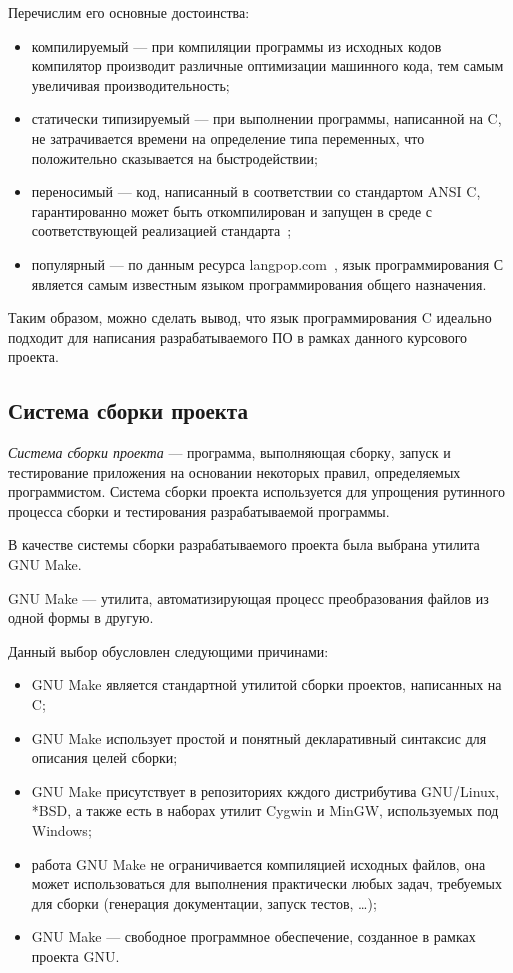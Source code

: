 Перечислим его основные достоинства:
\begin{itemize}
\item компилируемый --- при компиляции программы из исходных кодов
  компилятор производит различные оптимизации машинного кода, 
  тем самым увеличивая производительность;
\item статически типизируемый --- при выполнении программы, написанной на C,
  не затрачивается времени на определение типа переменных,
  что положительно сказывается на быстродействии;
\item переносимый --- код, написанный в соответствии со стандартом ANSI C,
  гарантированно может быть откомпилирован и запущен в среде с 
  соответствующей реализацией стандарта~\cite{ansi_c};
\item популярный --- по данным ресурса langpop.com~\cite{langs_popularity},
  язык программирования С является самым известным языком программирования 
  общего назначения.
\end{itemize}

Таким образом, можно сделать вывод, что язык программирования C идеально 
подходит для написания разрабатываемого ПО в рамках данного курсового проекта. 

\subsection{Система сборки проекта}
\label{ssec:choice_build_system}

\textit{Система сборки проекта} --- программа, выполняющая сборку, 
запуск и тестирование приложения на основании некоторых правил,
определяемых программистом. 
Система сборки проекта используется для упрощения рутинного процесса сборки 
и тестирования разрабатываемой программы.

В качестве системы сборки разрабатываемого проекта была выбрана утилита GNU Make.

GNU Make --- утилита, автоматизирующая процесс преобразования файлов
из одной формы в другую.

Данный выбор обусловлен следующими причинами:
\begin{itemize}
\item GNU Make является стандартной утилитой сборки проектов,
  написанных на C;
\item GNU Make использует простой и понятный декларативный синтаксис для
  описания целей сборки;
\item GNU Make присутствует в репозиториях кждого дистрибутива GNU/Linux, *BSD,
  а также есть в наборах утилит Cygwin и MinGW, используемых под Windows;
\item работа GNU Make не ограничивается компиляцией исходных файлов,
  она может использоваться для выполнения практически любых задач,
  требуемых для сборки (генерация документации, запуск тестов, \dots);
\item GNU Make --- свободное программное обеспечение,
  созданное в рамках проекта GNU.
\end{itemize}

